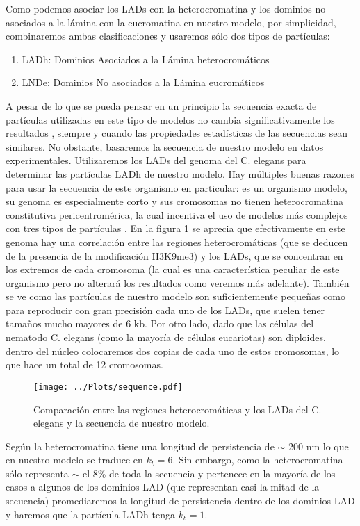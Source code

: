 Como podemos asociar los LADs con la heterocromatina y los dominios no asociados a la lámina con la eucromatina \cite{Bajpai2021} en nuestro modelo, por simplicidad, combinaremos ambas clasificaciones y usaremos sólo dos tipos de partículas:
\begin{enumerate}
    \item LADh: Dominios Asociados a la Lámina heterocromáticos
    \item LNDe: Dominios No asociados a la Lámina eucromáticos
\end{enumerate}

A pesar de lo que se pueda pensar en un principio la secuencia exacta de partículas utilizadas en este tipo de modelos no cambia significativamente los resultados \cite{Bajpai2021}, siempre y cuando las propiedades estadísticas de las secuencias sean similares. No obstante, basaremos la secuencia de nuestro modelo en datos experimentales. Utilizaremos los LADs del genoma del C. elegans \cite{Ho2014,C.elegans1998} para determinar las partículas LADh de nuestro modelo. Hay múltiples buenas razones para usar la secuencia de este organismo en particular: es un organismo modelo, su genoma es especialmente corto y sus cromosomas no tienen heterocromatina constitutiva pericentromérica, la cual incentiva el uso de modelos más complejos con tres tipos de partículas \cite{Falk2019}. En la figura \ref{fig:sequence} se aprecia que efectivamente en este genoma hay una correlación entre las regiones heterocromáticas (que se deducen de la presencia de la modificación H3K9me3) y los LADs, que se concentran en los extremos de cada cromosoma (la cual es una característica peculiar de este organismo pero no alterará los resultados como veremos más adelante). También se ve como las partículas de nuestro modelo son suficientemente pequeñas como para reproducir con gran precisión cada uno de los LADs, que suelen tener tamaños mucho mayores de 6 kb. Por otro lado, dado que las células del nematodo C. elegans (como la mayoría de células eucariotas) son diploides, dentro del núcleo colocaremos dos copias de cada uno de estos cromosomas, lo que hace un total de 12 cromosomas.

\begin{figure}
    \centering
    \texttt{[image: ../Plots/sequence.pdf]}
    \caption{Comparación entre las regiones heterocromáticas y los LADs del C. elegans y la secuencia de nuestro modelo.}
    \label{fig:sequence}
\end{figure}

Según \cite{Bystricky2004} la heterocromatina tiene una longitud de persistencia de $\sim$ 200 nm lo que en nuestro modelo se traduce en $k_b=6$. Sin embargo, como la heterocromatina sólo representa $\sim$ el 8\% de toda la secuencia y pertenece en la mayoría de los casos a algunos de los dominios LAD (que representan casi la mitad de la secuencia) promediaremos la longitud de persistencia dentro de los dominios LAD y haremos que la partícula LADh tenga $k_b=1$.

